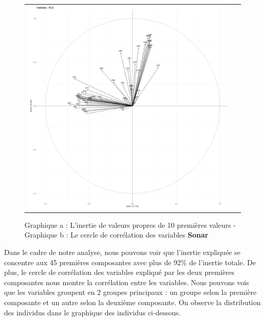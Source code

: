 \documentclass[a4paper,11pt,oneside,roman]{article}
\begin{document}
\begin{figure}[htb]
\begin{tabular}{c|c}
    \includegraphics[scale = .1]{discrimination/spambase2/varplot.png}
\end{tabular}
    \caption{Graphique a : L'inertie de valeurs propres de 10 premières valeurs - Graphique b : Le cercle de corrélation des variables \textbf{Sonar}}
    \label{fig:my_label}
\end{figure}
Dans le cadre de notre analyse, nous pouvons voir que l'inertie expliquée se concentre aux 45 premières composantes avec plus de 92\% de l'inertie totale. De plus, le cercle de corrélation des variables expliqué par les deux premières composantes nous montre la corrélation entre les variables. Nous pouvons vois que les variables groupent en 2 groupes principaux : un groupe selon la première composante et un autre selon la deuxième composante. On observe la distribution des individus dans le graphique des individus ci-dessous. 
\end{document}
